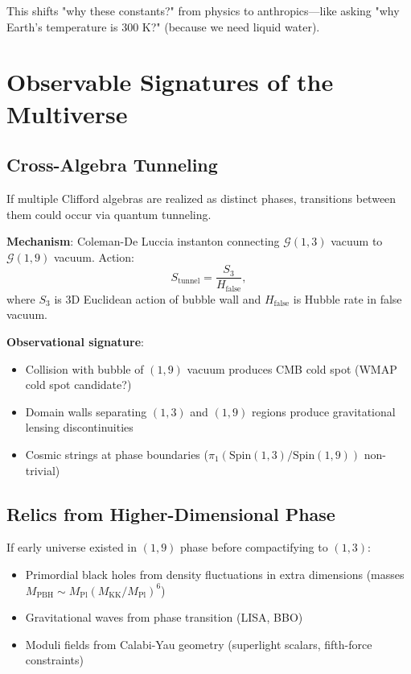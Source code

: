 \documentclass[11pt,a4paper]{article}
\numberwithin{equation}{section}
\theoremstyle{plain}
\theoremstyle{definition}
\theoremstyle{remark}
\newcommand{\Cl}{\mathcal{G}}               %
\newcommand{\Spin}{\mathrm{Spin}}
\begin{document}
This shifts "why these constants?" from physics to anthropics—like asking "why Earth's temperature is 300 K?" (because we need liquid water).

\section{Observable Signatures of the Multiverse}
\label{sec:observables}

\subsection{Cross-Algebra Tunneling}

If multiple Clifford algebras are realized as distinct phases, transitions between them could occur via quantum tunneling.

\textbf{Mechanism}: Coleman-De Luccia instanton connecting $\Cl(1,3)$ vacuum to $\Cl(1,9)$ vacuum. Action:
\begin{equation}
S_{\text{tunnel}} = \frac{S_3}{H_{\text{false}}},
\end{equation}
where $S_3$ is 3D Euclidean action of bubble wall and $H_{\text{false}}$ is Hubble rate in false vacuum.

\textbf{Observational signature}:
\begin{itemize}
\item Collision with bubble of $(1,9)$ vacuum produces CMB cold spot (WMAP cold spot candidate?)
\item Domain walls separating $(1,3)$ and $(1,9)$ regions produce gravitational lensing discontinuities
\item Cosmic strings at phase boundaries ($\pi_1(\Spin(1,3) / \Spin(1,9))$ non-trivial)
\end{itemize}

\subsection{Relics from Higher-Dimensional Phase}

If early universe existed in $(1,9)$ phase before compactifying to $(1,3)$:

\begin{itemize}
\item Primordial black holes from density fluctuations in extra dimensions (masses $M_{\text{PBH}} \sim M_{\text{Pl}} (M_{\text{KK}}/M_{\text{Pl}})^6$)
\item Gravitational waves from phase transition (LISA, BBO)
\item Moduli fields from Calabi-Yau geometry (superlight scalars, fifth-force constraints)
\end{itemize}
\end{document}

